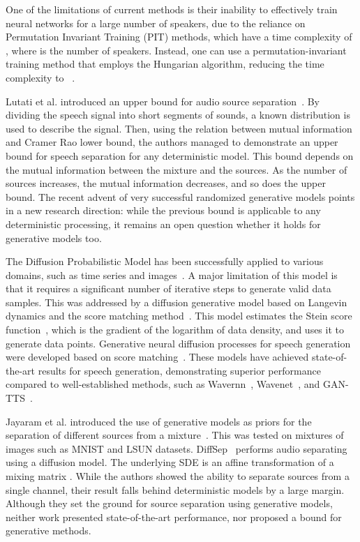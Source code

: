 \documentclass{article}
\theoremstyle{plain}
\theoremstyle{definition}
\theoremstyle{remark}
\begin{document}
One of the limitations of current methods is their inability to effectively train neural networks for a large number of speakers, due to the reliance on Permutation Invariant Training (PIT) methods, which have a time complexity of , where  is the number of speakers.  Instead, one can use a permutation-invariant training method that employs the Hungarian algorithm, reducing the time complexity to ~\cite{dovrat2021many}. 

Lutati et al. introduced an upper bound for audio source separation~\cite{sepit}. By dividing the speech signal into short segments of sounds, a known distribution is used to describe the signal. Then, using the relation between mutual information and Cramer Rao lower bound, the authors managed to demonstrate an upper bound for speech separation for any deterministic model. This bound depends on the mutual information between the mixture and the sources. As the number of sources increases, the mutual information decreases, and so does the upper bound. The recent advent of very successful randomized generative models points in a new research direction: while the previous bound is applicable to any deterministic processing, it remains an open question whether it holds for generative models too.



{The Diffusion Probabilistic Model has been successfully applied to various domains, such as time series and images~\cite{sohl2015deep}. A major limitation of this model is that it requires a significant number of iterative steps to generate valid data samples. This was addressed by a diffusion generative model based on Langevin dynamics and the score matching method~\cite{song2019generative}. This model estimates the Stein score function~\cite{liu2016kernelized}, which is the gradient of the logarithm of data density, and uses it to generate data points. Generative neural diffusion processes for speech generation were developed based on score matching~\cite{chen_wavegrad_2020,kong2020diffwave}. These models have achieved state-of-the-art results for speech generation, demonstrating superior performance compared to well-established methods, such as Wavernn~\cite{kalchbrenner2018efficient}, Wavenet~\cite{oord2016wavenet}, and GAN-TTS~\cite{binkowski2019high}.}

Jayaram et al. introduced the use of generative models as priors for the separation of different sources from a mixture~\cite{jayaram2020source}. This was tested on mixtures of images such as MNIST \cite{lecun-mnisthandwrittendigit-2010} and LSUN \cite{yu2015lsun} datasets. DiffSep~\cite{scheibler2022diffusion} performs audio separating using a diffusion model. The underlying SDE is an affine transformation of a mixing matrix . While the authors showed the ability to separate sources from a single channel, their result falls behind deterministic models by a large margin.
Although they set the ground for source separation using generative models, neither work presented state-of-the-art performance, nor proposed a bound for generative methods.
\end{document}
